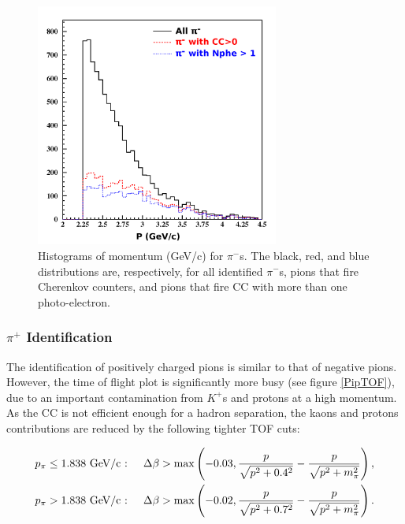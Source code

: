 \begin{figure}[tbp]
\centering
\includegraphics[width=8cm] {chap5-fig/fig06.png} 
\caption {Histograms of momentum (GeV/c) for $\pi^-$s. The black, red, and blue distributions are, respectively, for all identified $\pi^-$s, pions that fire Cherenkov counters, and pions that fire CC with more than one photo-electron.}
\label{PionCC}
\end{figure}

\subsubsection{$\pi^+$ Identification}

The identification of positively charged pions is similar to that of negative 
pions. However, the time of flight plot is significantly more busy (see figure 
\ref{PipTOF}), due to an important contamination from $K^+$s and protons at a
high momentum. As the CC is not efficient enough for a hadron separation, the 
kaons and protons contributions are reduced by the following tighter TOF cuts:

\begin{subequations}\label{TOF-Pip}
\begin{align}
    p_\pi &\leq 1.838 \text{ GeV/c : }
  & \Delta \beta &> \max\left(-0.03,{p \over\sqrt{p^2+0.4^2}}- {p \over \sqrt{p^2 + m_\pi^2}}\right), \\ 
    p_\pi &> 1.838    \text{ GeV/c : }
  & \Delta \beta &> \max\left(-0.02,{p \over\sqrt{p^2+0.7^2}}- {p \over \sqrt{p^2 + m_\pi^2}}\right).
\end{align}
\end{subequations}

